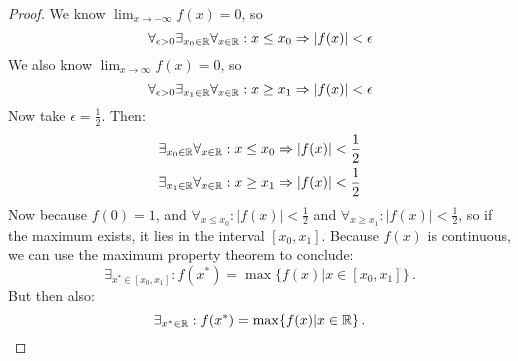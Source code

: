 \documentclass[week=6]{homework}
\begin{document}
\begin{questions}
        \begin{proof}
        	We know $\lim_{x \to -\infty} f(x) = 0$, so 
        	\[
	        	\forall_{\epsilon > 0} \exists_{x_0 \in \reals} \forall_{x \in \reals} : x \le x_0 \Rightarrow |f(x)| < \epsilon
        	\]
        	We also know $\lim_{x \to \infty} f(x) = 0$, so
        	\[
	        	\forall_{\epsilon > 0} \exists_{x_1 \in \reals} \forall_{x \in \reals} : x \ge x_1 \Rightarrow |f(x)| < \epsilon
        	\]
        	Now take $\epsilon = \frac{1}{2}$. Then:
        	\begin{align*}
        		\exists_{x_0 \in \mathbb{R}} \forall_{x \in \mathbb{R}} : x \le x_0 &\Rightarrow |f(x)| < \frac{1}{2} \\
        		\exists_{x_1 \in \mathbb{R}} \forall_{x \in \mathbb{R}} : x \ge x_1 &\Rightarrow |f(x)| < \frac{1}{2}
        	\end{align*}
        	Now because $f(0) = 1$, and $\forall_{x \le x_0} : |f(x)| < \frac{1}{2} $ and $\forall_{x \ge x_1} : |f(x)| < \frac{1}{2} $, so if the maximum exists, it lies in the interval $[x_0, x_1]$. Because $f(x)$ is continuous, we can use the maximum property theorem to conclude:
        	\[
	        	\exists_{x^* \in [x_0, x_1]} : f(x^*) = \max\{f(x) | x \in [x_0, x_1] \}\,. 
        	\]
        	But then also:
        	\[
	        	\exists_{x^* \in \mathbb{R}} : f(x^*) = \max\{f(x) | x \in \mathbb{R} \}\,.
        	\]
        \end{proof}
        
     \end{questions}
\end{document}
